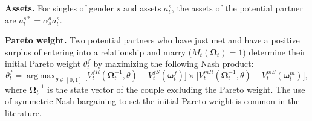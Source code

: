 \documentclass[12pt]{article}
\numberwithin{table}{section}
\DeclareMathOperator*{\argmax}{arg\,max}
\begin{document}
\textbf{Assets.} For singles of gender $s$ and assets $a_t^{s}$, the assets of the potential partner are $a_t^{s*}=\alpha^a_s a_t^{s}.$

\textbf{Pareto weight.} Two potential partners who have just met and have a positive surplus of entering into a relationship and marry ($M_{t}(\boldsymbol{\Omega}_{t})=1$) determine their initial Pareto weight $\theta^f_t$ by maximizing the following Nash product:
\begin{equation}\label{nash_couple}
	\theta^f_t= \argmax_{\theta\in [0,1]} \big[V_t^{fR}(\boldsymbol{\Omega}^{-1}_t,\theta)- V_t^{fS}(\boldsymbol{\omega}^f_t)\big]\times\big[ V_t^{mR}(\boldsymbol{\Omega}^{-1}_t,\theta)- V_t^{mS}(\boldsymbol{\omega}^m_t)\big],
\end{equation}
where $\boldsymbol{\Omega}^{-1}_t$ is the state vector of the couple excluding the Pareto weight. The use of symmetric Nash bargaining to set the initial Pareto weight is common in the literature.
\end{document}
